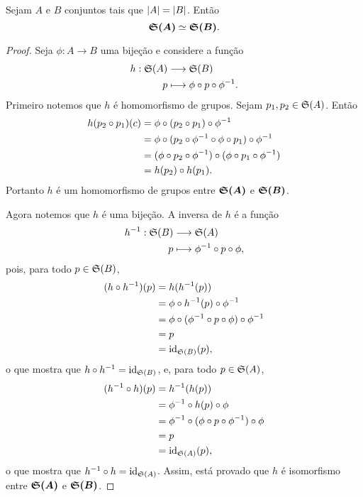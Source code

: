 \begin{prop}
	Sejam $A$ e $B$ conjuntos tais que $\left\vert{A}\right\vert = \left\vert{B}\right\vert$. Então
	\begin{equation*}
	\bm{\mathfrak{S}(A)} \simeq \bm{\mathfrak{S}(B)}.
	\end{equation*}
\end{prop}
\begin{proof}
	Seja $\phi: A \to B$ uma bijeção e considere a função
	\begin{align*}
	h : \mathfrak{S}(A) &\longrightarrow \mathfrak{S}(B) \\
			p &\longmapsto \phi \circ p \circ \phi^{-1}.
	\end{align*}
Primeiro notemos que $h$ é homomorfismo de grupos. Sejam $p_1,p_2 \in \mathfrak{S}(A)$. Então
	\begin{align*}
	h(p_2 \circ p_1)(c) &= \phi \circ (p_2 \circ p_1) \circ \phi^{-1} \\
			&= \phi \circ (p_2 \circ \phi^{-1} \circ \phi \circ p_1) \circ \phi^{-1} \\
			&= (\phi \circ p_2 \circ \phi^{-1}) \circ (\phi \circ p_1 \circ \phi^{-1}) \\
			&= h(p_2) \circ h(p_1).
	\end{align*}
Portanto $h$ é um homomorfismo de grupos entre $\bm{\mathfrak{S}(A)}$ e $\bm{\mathfrak{S}(B)}$.

Agora notemos que $h$ é uma bijeção. A inversa de $h$ é a função
	\begin{align*}
	h^{-1} : \mathfrak{S}(B) &\longrightarrow \mathfrak{S}(A) \\
			p &\longmapsto \phi^{-1} \circ p \circ \phi,
	\end{align*}
pois, para todo $p \in \mathfrak{S}(B)$,
	\begin{align*}
	(h \circ h^{-1}) (p) &= h (h^{-1}(p)) \\
			&= \phi \circ h^{-1}(p) \circ \phi^{-1} \\
			&= \phi \circ (\phi^{-1} \circ p \circ \phi) \circ \phi^{-1} \\
			&= p \\
			&= \mathrm{id}_{\mathfrak{S}(B)}(p),
	\end{align*}
o que mostra que $h \circ h^{-1} = \mathrm{id}_{\mathfrak{S}(B)}$, e, para todo $p \in \mathfrak{S}(A)$,
	\begin{align*}
	(h^{-1} \circ h) (p) &= h^{-1} (h(p)) \\
			&= \phi^{-1} \circ h(p) \circ \phi \\
			&= \phi^{-1} \circ (\phi \circ p \circ \phi^{-1}) \circ \phi \\
			&= p \\
			&= \mathrm{id}_{\mathfrak{S}(A)}(p),
	\end{align*}
o que mostra que $h^{-1} \circ h = \mathrm{id}_{\mathfrak{S}(A)}$. Assim, está provado que $h$ é isomorfismo entre $\bm{\mathfrak{S}(A)}$ e $\bm{\mathfrak{S}(B)}$.
\end{proof}

